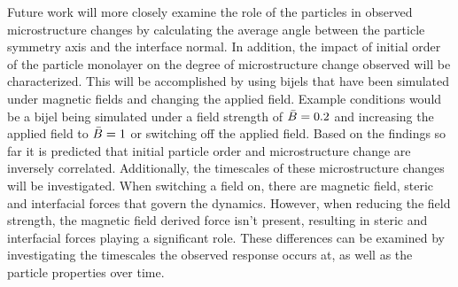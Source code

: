 Future work will more closely examine the role of the particles in observed microstructure changes 
by calculating the average angle between the particle symmetry axis and the interface normal. 
In addition, the impact of initial order of the particle monolayer on the degree of microstructure 
change observed will be characterized. This will be accomplished by using bijels that have been 
simulated under magnetic fields and changing the applied field. Example conditions would be a bijel 
being simulated under a field strength of $\Bar{B} = 0.2$ and increasing the applied field to $\Bar{B} = 1$ 
or switching off the applied field. Based on the findings so far it is predicted that initial particle order 
and microstructure change are inversely correlated. Additionally, the timescales of these microstructure 
changes will be investigated. When switching a field on, there are magnetic field, steric and interfacial 
forces that govern the dynamics. However, when reducing the field strength, the magnetic field derived force 
isn't present, resulting in steric and interfacial forces playing a significant role. These differences can 
be examined by investigating the timescales the observed response occurs at, as well as the particle 
properties over time.

